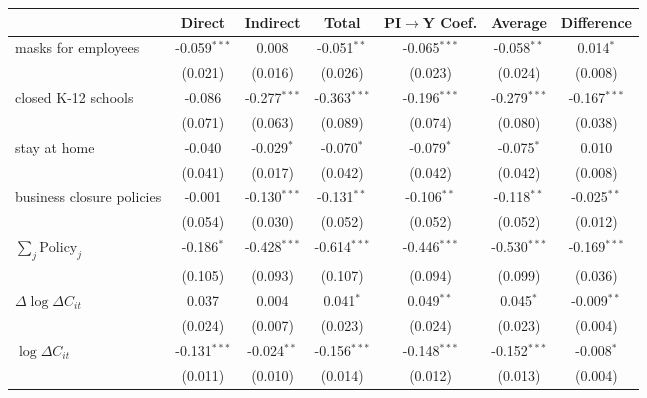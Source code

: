 
\begin{tabular}{lccccc|>{}c}
\toprule
  & Direct & Indirect & Total & PI$\to$Y Coef. & Average & Difference\\
\midrule
masks for employees & -0.059$^{***}$ & 0.008 & -0.051$^{**}$ & -0.065$^{***}$ & -0.058$^{**}$ & 0.014$^{*}$\\
 & (0.021) & (0.016) & (0.026) & (0.023) & (0.024) & (0.008)\\
closed K-12 schools & -0.086 & -0.277$^{***}$ & -0.363$^{***}$ & -0.196$^{***}$ & -0.279$^{***}$ & -0.167$^{***}$\\
 & (0.071) & (0.063) & (0.089) & (0.074) & (0.080) & (0.038)\\
stay at home & -0.040 & -0.029$^{*}$ & -0.070$^{*}$ & -0.079$^{*}$ & -0.075$^{*}$ & 0.010\\
 & (0.041) & (0.017) & (0.042) & (0.042) & (0.042) & (0.008)\\
business closure policies & -0.001 & -0.130$^{***}$ & -0.131$^{**}$ & -0.106$^{**}$ & -0.118$^{**}$ & -0.025$^{**}$\\
 & (0.054) & (0.030) & (0.052) & (0.052) & (0.052) & (0.012)\\
$\sum_j \mathrm{Policy}_j$ & -0.186$^{*}$ & -0.428$^{***}$ & -0.614$^{***}$ & -0.446$^{***}$ & -0.530$^{***}$ & -0.169$^{***}$\\
 & (0.105) & (0.093) & (0.107) & (0.094) & (0.099) & (0.036)\\
$\Delta \log \Delta C_{it}$ & 0.037 & 0.004 & 0.041$^{*}$ & 0.049$^{**}$ & 0.045$^{*}$ & -0.009$^{**}$\\
 & (0.024) & (0.007) & (0.023) & (0.024) & (0.023) & (0.004)\\
$\log \Delta C_{it}$ & -0.131$^{***}$ & -0.024$^{**}$ & -0.156$^{***}$ & -0.148$^{***}$ & -0.152$^{***}$ & -0.008$^{*}$\\
 & (0.011) & (0.010) & (0.014) & (0.012) & (0.013) & (0.004)\\
\bottomrule
\end{tabular}